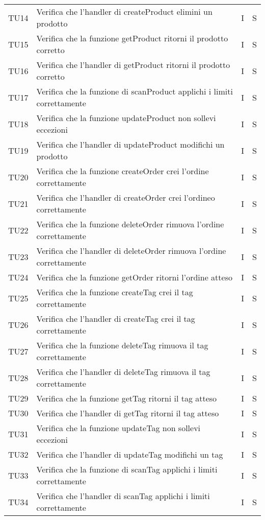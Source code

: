 \begin{center}
\begin{longtable}[!h]{p{45px} p{255px} p{35px} p{35px}}
        TU14 & Verifica che l'handler di createProduct elimini un prodotto & I & S \\
        TU15 & Verifica che la funzione getProduct ritorni il prodotto corretto & I & S \\
        TU16 & Verifica che l'handler di getProduct ritorni il prodotto corretto & I & S \\
        TU17 & Verifica che la funzione di scanProduct applichi i limiti correttamente & I & S \\
        TU18 & Verifica che la funzione updateProduct non sollevi eccezioni & I & S \\
        TU19 & Verifica che l'handler di updateProduct modifichi un prodotto & I & S \\
        TU20 & Verifica che la funzione createOrder crei l'ordine correttamente & I & S \\
        TU21 & Verifica che l'handler di createOrder crei l'ordineo correttamente & I & S \\       
        TU22 & Verifica che la funzione deleteOrder rimuova l'ordine correttamente & I & S \\
        TU23 & Verifica che l'handler di deleteOrder rimuova l'ordine correttamente & I & S \\
        TU24 & Verifica che la funzione getOrder ritorni l'ordine atteso & I & S \\
        TU25 & Verifica che la funzione createTag crei il tag correttamente & I & S \\
        TU26 & Verifica che l'handler di createTag crei il tag correttamente & I & S \\       
        TU27 & Verifica che la funzione deleteTag rimuova il tag correttamente & I & S \\
        TU28 & Verifica che l'handler di deleteTag rimuova il tag correttamente & I & S \\
        TU29 & Verifica che la funzione getTag ritorni il tag atteso & I & S \\
        TU30 & Verifica che l'handler di getTag ritorni il tag atteso & I & S \\
        TU31 & Verifica che la funzione updateTag non sollevi eccezioni & I & S \\
        TU32 & Verifica che l'handler di updateTag modifichi un tag & I & S \\
        TU33 & Verifica che la funzione di scanTag applichi i limiti correttamente & I & S \\
        TU34 & Verifica che l'handler di scanTag applichi i limiti correttamente & I & S \\
    \end{longtable}
\end{center}

